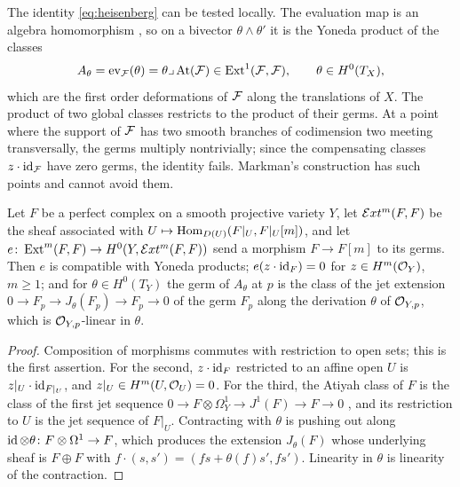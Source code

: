 The identity \eqref{eq:heisenberg} can be tested locally. The evaluation map
is an algebra homomorphism \cite[(8.3.3)]{Mar25a}, so on a bivector
$\theta\wedge\theta'$ it is the Yoneda product of the classes
\[
  A_{\theta}=\operatorname{ev}_{\mathcal{F}}(\theta)=\theta\lrcorner\,\mathrm{At}(\mathcal{F})
  \in\operatorname{Ext}^{1}(\mathcal{F},\mathcal{F}),\qquad\theta\in H^{0}(T_{X}),
\]
which are the first order deformations of $\mathcal{F}$ along the translations of
$X$. The product of two global classes restricts to the product of their
germs. At a point where the support of $\mathcal{F}$ has two smooth branches of
codimension two meeting transversally, the germs multiply nontrivially;
since the compensating classes $z\cdot\operatorname{id}_{\mathcal{F}}$ have zero germs, the
identity fails. Markman's construction has such points and cannot avoid
them.

\begin{lemma}[Localisation]\label{lem:edge}
Let $F$ be a perfect complex on a smooth projective variety $Y$, let
$\mathcal{E} xt^{m}(F,F)$ be the sheaf associated with $U\mapsto\operatorname{Hom}_{D(U)}(F|_{U},F|_{U}[m])$,
and let $e\colon\operatorname{Ext}^{m}(F,F)\to H^{0}(Y,\mathcal{E} xt^{m}(F,F))$ send a morphism
$F\to F[m]$ to its germs. Then $e$ is compatible with Yoneda products;
$e(z\cdot\operatorname{id}_{F})=0$ for $z\in H^{m}(\mathcal{O}_{Y})$, $m\ge1$; and for
$\theta\in H^{0}(T_{Y})$ the germ of $A_{\theta}$ at $p$ is the class of the
jet extension $0\to F_{p}\to J_{\theta}(F_{p})\to F_{p}\to0$ of the germ
$F_{p}$ along the derivation $\theta$ of $\mathcal{O}_{Y,p}$, which is
$\mathcal{O}_{Y,p}$-linear in $\theta$.
\end{lemma}

\begin{proof}
Composition of morphisms commutes with restriction to open sets; this is the
first assertion. For the second, $z\cdot\operatorname{id}_{F}$ restricted to an affine open
$U$ is $z|_{U}\cdot\operatorname{id}_{F|_{U}}$, and $z|_{U}\in H^{m}(U,\mathcal{O}_{U})=0$. For the
third, the Atiyah class of $F$ is the class of the first jet sequence
$0\to F\otimes\Omega^{1}_{Y}\to J^{1}(F)\to F\to0$ \cite[Section 3]{BF03},
and its restriction to $U$ is the jet sequence of $F|_{U}$. Contracting with
$\theta$ is pushing out along $\operatorname{id}\otimes\theta\colon F\otimes\Omega^{1}\to F$,
which produces the extension $J_{\theta}(F)$ whose underlying sheaf is
$F\oplus F$ with $f\cdot(s,s')=(fs+\theta(f)s',fs')$. Linearity in $\theta$
is linearity of the contraction.
\end{proof}

